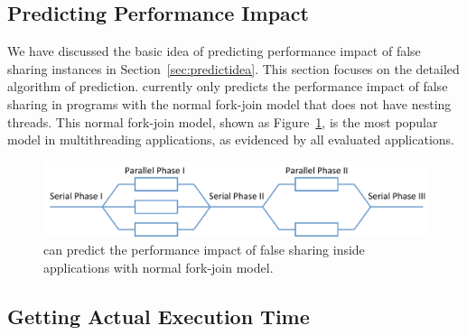 \subsection{Predicting Performance Impact}

\label{sec:predictimprove}


We have discussed the basic idea of predicting performance impact of false sharing instances in Section~\ref{sec:predictidea}. This section focuses on the detailed algorithm of prediction. \Cheetah{} currently only predicts the performance impact of false sharing in programs with the normal fork-join model that does not have nesting threads. This normal fork-join model, shown as Figure~\ref{fig:forkjoinmodel}, is the most popular model in multithreading applications, as evidenced by all evaluated applications. 

\begin{figure}[ht!]
\begin{center}
\includegraphics[width=6.5in]{figure/forkjoin}
\end{center}
\caption{\Cheetah{} can predict the performance impact of false sharing inside applications with normal fork-join model.
\label{fig:forkjoinmodel}}
\end{figure}


\subsection{Getting Actual Execution Time}
\label{sec:getactualtime}

